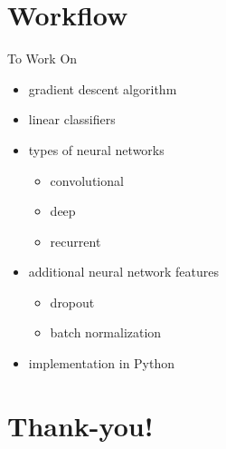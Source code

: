 \documentclass{beamer}
\begin{document}
  \section{Workflow}
  \begin{frame}{To Work On}
    \begin{itemize}
      \item gradient descent algorithm
      \item linear classifiers
      \item types of neural networks
      \begin{itemize}
        \item convolutional
        \item deep
        \item recurrent
      \end{itemize}
      \item additional neural network features
      \begin{itemize}
        \item dropout %
        \item batch normalization
      \end{itemize}
      \item implementation in Python
    \end{itemize}
  \end{frame}

  \section{Thank-you!}
\end{document}
